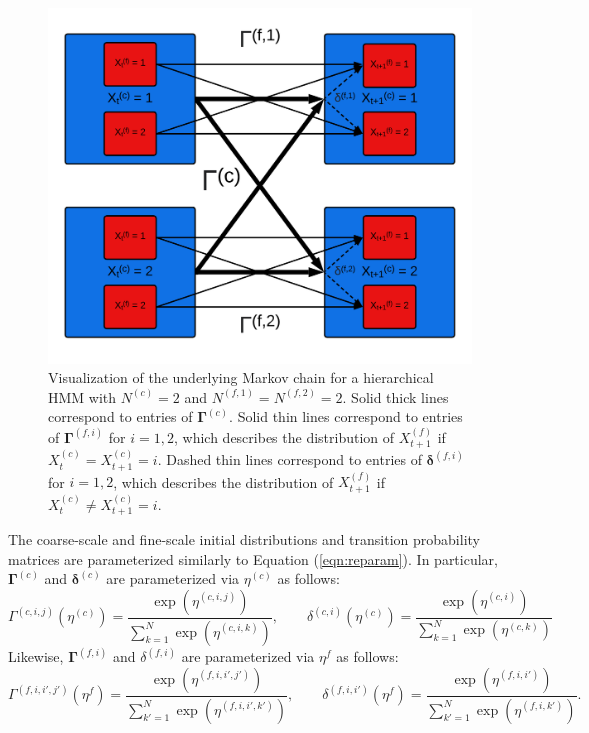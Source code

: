\begin{figure}
    \centering
    \includegraphics{plt/HHMM.png}
    \caption{Visualization of the underlying Markov chain for a hierarchical HMM with $N^{(c)} = 2$ and $N^{(f,1)} = N^{(f,2)} = 2$. Solid thick lines correspond to entries of $\boldsymbol{\Gamma}^{(c)}$. Solid thin lines correspond to entries of $\boldsymbol{\Gamma}^{(f,i)}$ for $i = 1,2$, which describes the distribution of $X_{t+1}^{(f)}$ if $X^{(c)}_{t} = X^{(c)}_{t+1} = i$. Dashed thin lines correspond to entries of $\boldsymbol{\delta}^{(f,i)}$ for $i = 1,2$, which describes the distribution of $X_{t+1}^{(f)}$ if $X^{(c)}_{t} \neq X^{(c)}_{t+1} = i$.}
    \label{fig:HHMM}
\end{figure}

The coarse-scale and fine-scale initial distributions and transition probability matrices are parameterized similarly to Equation (\ref{eqn:reparam}). In particular, $\boldsymbol{\Gamma}^{(c)}$ and $\boldsymbol{\delta}^{(c)}$ are parameterized via $\eta^{(c)}$ as follows:
%
\begin{equation}
    \Gamma^{(c,i,j)}(\eta^{(c)}) = \frac{\exp(\eta^{(c,i,j)})}{\sum_{k=1}^N \exp(\eta^{(c,i,k)})}, \qquad \delta^{(c,i)}(\eta^{(c)}) = \frac{\exp(\eta^{(c,i)})}{\sum_{k=1}^N \exp(\eta^{(c,k)})}
    \label{eqn:reparam_coarse}
\end{equation}
%
Likewise, $\boldsymbol{\Gamma}^{(f,i)}$ and $\delta^{(f,i)}$ are parameterized via $\eta^f$ as follows:
%
\begin{equation}
    \Gamma^{(f,i,i',j')}(\eta^f) = \frac{\exp(\eta^{(f,i,i',j')})}{\sum_{k'=1}^N \exp(\eta^{(f,i,i',k')})}, \qquad \delta^{(f,i,i')}(\eta^{f}) = \frac{\exp(\eta^{(f,i,i')})}{\sum_{k'=1}^N \exp(\eta^{(f,i,k')})}.
    \label{eqn:reparam_fine}
\end{equation}
%


